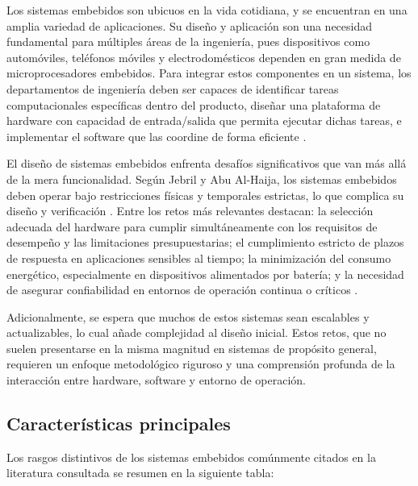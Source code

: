 Los sistemas embebidos son ubicuos en la vida cotidiana, y se encuentran en una amplia variedad de aplicaciones. Su diseño y aplicación son una necesidad fundamental para múltiples áreas de la ingeniería, pues dispositivos como automóviles, teléfonos móviles y electrodomésticos dependen en gran medida de microprocesadores embebidos. Para integrar estos componentes en un sistema, los departamentos de ingeniería deben ser capaces de identificar tareas computacionales específicas dentro del producto, diseñar una plataforma de hardware con capacidad de entrada/salida que permita ejecutar dichas tareas, e implementar el software que las coordine de forma eficiente \cite{wolf_embedded_2012}. 

El diseño de sistemas embebidos enfrenta desafíos significativos que van más allá de la mera funcionalidad. Según Jebril y Abu Al-Haija, los sistemas embebidos deben operar bajo restricciones físicas y temporales estrictas, lo que complica su diseño y verificación \cite{jebril_challenges_2017}. Entre los retos más relevantes destacan: la selección adecuada del hardware para cumplir simultáneamente con los requisitos de desempeño y las limitaciones presupuestarias; el cumplimiento estricto de plazos de respuesta en aplicaciones sensibles al tiempo; la minimización del consumo energético, especialmente en dispositivos alimentados por batería; y la necesidad de asegurar confiabilidad en entornos de operación continua o críticos \cite{wolf_embedded_2012}.  

Adicionalmente, se espera que muchos de estos sistemas sean escalables y actualizables, lo cual añade complejidad al diseño inicial. Estos retos, que no suelen presentarse en la misma magnitud en sistemas de propósito general, requieren un enfoque metodológico riguroso y una comprensión profunda de la interacción entre hardware, software y entorno de operación.

\subsection{Características principales}

Los rasgos distintivos de los sistemas embebidos comúnmente citados en la literatura consultada se resumen en la siguiente tabla: 

